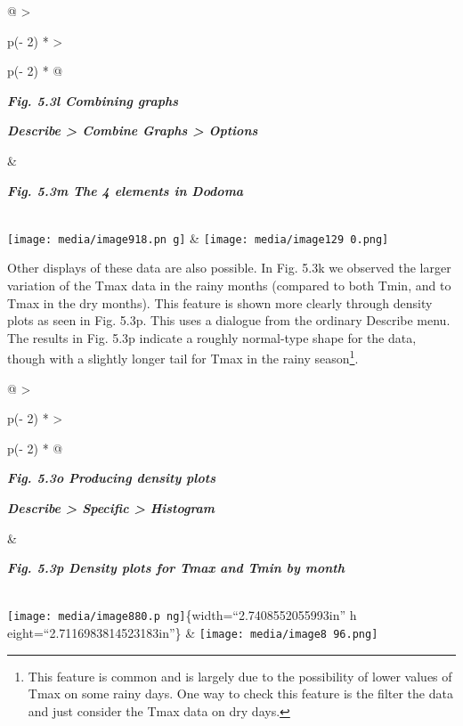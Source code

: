 \documentclass[
  letterpaper,
  DIV=11,
  numbers=noendperiod]{scrreprt}
\begin{document}
\begin{longtable}[]{@{}
  >{\raggedright\arraybackslash}p{(\columnwidth - 2\tabcolsep) * }
  >{\raggedright\arraybackslash}p{(\columnwidth - 2\tabcolsep) * }@{}}
\toprule\noalign{}
\begin{minipage}[b]{\linewidth}\raggedright
\textbf{\emph{Fig. 5.3l Combining graphs}}

\textbf{\emph{Describe \textgreater{} Combine Graphs \textgreater{}
Options}}
\end{minipage} & \begin{minipage}[b]{\linewidth}\raggedright
\textbf{\emph{Fig. 5.3m The 4 elements in Dodoma}}
\end{minipage} \\
\midrule\noalign{}
\endhead
\bottomrule\noalign{}
\endlastfoot
\texttt{[image: media/image918.pn g]} &
\texttt{[image: media/image129 0.png]} \\
\end{longtable}

Other displays of these data are also possible. In Fig. 5.3k we observed
the larger variation of the Tmax data in the rainy months (compared to
both Tmin, and to Tmax in the dry months). This feature is shown more
clearly through density plots as seen in Fig. 5.3p. This uses a dialogue
from the ordinary Describe menu. The results in Fig. 5.3p indicate a
roughly normal-type shape for the data, though with a slightly longer
tail for Tmax in the rainy season\footnote{This feature is common and is
  largely due to the possibility of lower values of Tmax on some rainy
  days. One way to check this feature is the filter the data and just
  consider the Tmax data on dry days.}.

\begin{longtable}[]{@{}
  >{\raggedright\arraybackslash}p{(\columnwidth - 2\tabcolsep) * }
  >{\raggedright\arraybackslash}p{(\columnwidth - 2\tabcolsep) * }@{}}
\toprule\noalign{}
\begin{minipage}[b]{\linewidth}\raggedright
\textbf{\emph{Fig. 5.3o Producing density plots}}

\textbf{\emph{Describe \textgreater{} Specific \textgreater{}
Histogram}}
\end{minipage} & \begin{minipage}[b]{\linewidth}\raggedright
\textbf{\emph{Fig. 5.3p Density plots for Tmax and Tmin by month}}
\end{minipage} \\
\midrule\noalign{}
\endhead
\bottomrule\noalign{}
\endlastfoot
\texttt{[image: media/image880.p ng]}\{width=``2.7408552055993in'' h
eight=``2.7116983814523183in''\} &
\texttt{[image: media/image8 96.png]} \\
\end{longtable}
\end{document}
